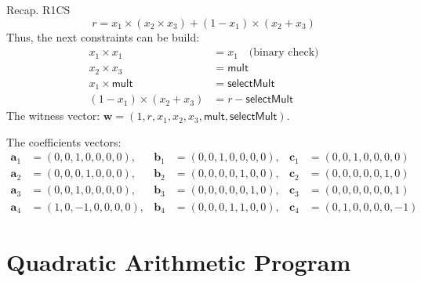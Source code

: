 \documentclass{zkdl-presentation-template}
\begin{document}
    \begin{frame}{Recap. R1CS}
        \vspace{-10pt}
        \begin{equation*}
            r = x_1 \times (x_2 \times x_3) + (1 - x_1) \times (x_2 + x_3)
        \end{equation*}
        \pause
        Thus, the next constraints can be build:
        \vspace{-5pt}
        \begin{align*}
            x_1 \times x_1 &= x_1 \quad \text{(binary check)} \tag{1} \\
            x_2 \times x_3 &= \mathsf{mult} \tag{2} \\
            x_1 \times \mathsf{mult} &= \mathsf{selectMult} \tag{3} \\
            (1 - x_1) \times (x_2 + x_3) &= r - \mathsf{selectMult} \tag{4}
        \end{align*}
        \pause
        The witness vector: $\boldsymbol{w} = (1, r, x_1, x_2, x_3, \mathsf{mult}, \mathsf{selectMult})$.
        
        \pause
        \vspace{2pt}
        The coefficients vectors:
        \vspace{-25pt}
        {\center\small\begin{align*}
            \boldsymbol{a}_1 &= (0, 0, 1, 0, 0, 0, 0), & \boldsymbol{b}_1 &= (0, 0, 1, 0, 0, 0, 0), & \boldsymbol{c}_1 &= (0, 0, 1, 0, 0, 0, 0) \\
            \boldsymbol{a}_2 &= (0, 0, 0, 1, 0, 0, 0), & \boldsymbol{b}_2 &= (0, 0, 0, 0, 1, 0, 0), & \boldsymbol{c}_2 &= (0, 0, 0, 0, 0, 1, 0) \\
            \boldsymbol{a}_3 &= (0, 0, 1, 0, 0, 0, 0), & \boldsymbol{b}_3 &= (0, 0, 0, 0, 0, 1, 0), & \boldsymbol{c}_3 &= (0, 0, 0, 0, 0, 0, 1) \\
            \boldsymbol{a}_4 &= (1, 0, -1, 0, 0, 0, 0), & \boldsymbol{b}_4 &= (0, 0, 0, 1, 1, 0, 0), & \boldsymbol{c}_4 &= (0, 1, 0, 0, 0, 0, -1)
        \end{align*}}
    \end{frame}
    
    \section[QAP]{Quadratic Arithmetic Program}
\end{document}
